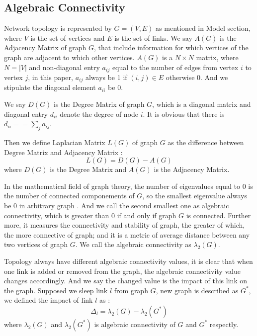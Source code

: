 \documentclass[conference]{IEEEtran}
\begin{document}
\subsection{Algebraic Connectivity}
Network topology is represented by $G = (V, E)$ as mentioned in Model section, where $V$ is the set of vertices
and $E$ is the set of links. We say $A(G)$ is the Adjacency Matrix of graph $G$, that include information for which
vertices of the graph are adjacent to which other vertices. $A(G)$ is a $N \times N$ matrix, where
$N = |V|$ and non-diagonal entry $a_{ij}$ equal to the number of edges from vertex $i$ to vertex $j$, in this paper,
$a_{ij}$ always be 1 if $(i,j) \in E$ otherwise 0. And we stipulate the diagonal element $a_{ii}$ be 0.


We say $D(G)$ is the Degree Matrix of graph $G$, which is a diagonal matrix and diagonal entry $d_{ii}$ denote 
the degree of node $i$. It is obvious that there is $d_{ii} == \sum_{j} a_{ij}$.


Then we define Laplacian Matrix $L(G)$ of graph $G$ as the difference between Degree Matrix and Adjacency Matrix :
\begin{equation}
	L(G) = D(G) - A(G)
\end{equation}
where $D(G)$ is the Degree Matrix and $A(G)$ is the Adjacency Matrix.


In the mathematical field of graph theory, the number of eigenvalues equal to 0 is the number of connected 
componements of $G$, so the smallest eigenvalue always be 0 in arbitrary graph . And we call the second smallest one as
algebraic connectivity, which is greater than 0 if and only if graph $G$ is connected. Further more,  
it measures the connectivity and stability of graph, the greater of which, the more connective of graph;
and it is a metric of average distance between any two vertices of graph $G$. We call the algebraic connectivity as
$\lambda_2(G)$.


Topology always have different algebraic connectivity values, it is clear that when one link is added or 
removed from the graph, the algebraic connectivity value changes accordingly. And we say the changed value
is the impact of this link on the graph. Supposed we sleep link $l$ from graph $G$, new graph is described as $G^*$, 
we defined the impact of link $l$ as :
\begin{equation}
	\Delta_l = \lambda_2(G) - \lambda_2(G^*)
\end{equation}
where $\lambda_2(G)$ and $\lambda_2(G^*)$ is algebraic connectivity of $G$ and $G^*$ respectly.
\end{document}
